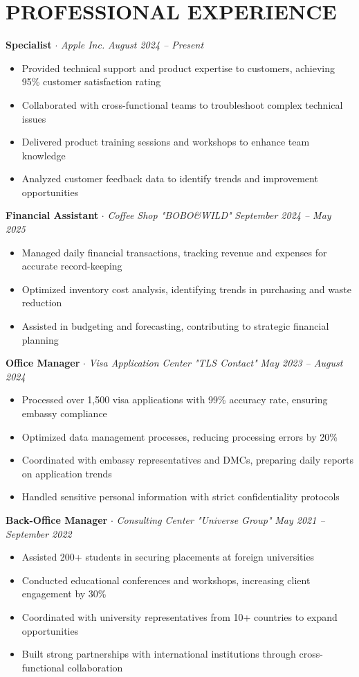 \documentclass[11pt,a4paper]{article}
\begin{document}
\section*{PROFESSIONAL EXPERIENCE}

\textbf{Specialist} $\cdot$ \textit{Apple Inc.} \hfill \textit{August 2024 -- Present}
\begin{itemize}
    \item Provided technical support and product expertise to customers, achieving 95\% customer satisfaction rating
    \item Collaborated with cross-functional teams to troubleshoot complex technical issues
    \item Delivered product training sessions and workshops to enhance team knowledge
    \item Analyzed customer feedback data to identify trends and improvement opportunities
\end{itemize}

\textbf{Financial Assistant} $\cdot$ \textit{Coffee Shop "BOBO\&WILD"} \hfill \textit{September 2024 -- May 2025}
\begin{itemize}
    \item Managed daily financial transactions, tracking revenue and expenses for accurate record-keeping
    \item Optimized inventory cost analysis, identifying trends in purchasing and waste reduction
    \item Assisted in budgeting and forecasting, contributing to strategic financial planning
\end{itemize}

\textbf{Office Manager} $\cdot$ \textit{Visa Application Center "TLS Contact"} \hfill \textit{May 2023 -- August 2024}
\begin{itemize}
    \item Processed over 1,500 visa applications with 99\% accuracy rate, ensuring embassy compliance
    \item Optimized data management processes, reducing processing errors by 20\%
    \item Coordinated with embassy representatives and DMCs, preparing daily reports on application trends
    \item Handled sensitive personal information with strict confidentiality protocols
\end{itemize}

\textbf{Back-Office Manager} $\cdot$ \textit{Consulting Center "Universe Group"} \hfill \textit{May 2021 -- September 2022}
\begin{itemize}
    \item Assisted 200+ students in securing placements at foreign universities
    \item Conducted educational conferences and workshops, increasing client engagement by 30\%
    \item Coordinated with university representatives from 10+ countries to expand opportunities
    \item Built strong partnerships with international institutions through cross-functional collaboration
\end{itemize}
\end{document}

